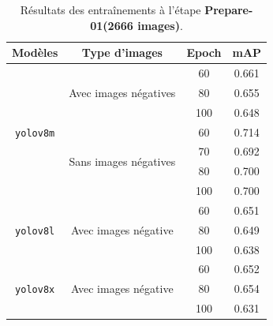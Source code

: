 \begin{table}[H]
	\centering
	\begin{tabular}{|c|c|c|c|}
		\hline
		\textbf{Modèles} & \textbf{Type d'images}                 & \textbf{Epoch} & \textbf{mAP} \\ \hline
		\multirow{7}{*}{\texttt{yolov8m}}
		                 & \multirow{3}{*}{Avec images négatives}
		                 & 60                                     & 0.661                         \\ \cline{3-4}
		                 &                                        & 80             & 0.655        \\ \cline{3-4}
		                 &                                        & 100            & 0.648        \\ \cline{2-4}
		                 & \multirow{4}{*}{Sans images négatives}
		                 & 60                                     & 0.714                         \\ \cline{3-4}
		                 &                                        & 70             & 0.692        \\ \cline{3-4}
		                 &                                        & 80             & 0.700        \\ \cline{3-4}
		                 &                                        & 100            & 0.700        \\ \hline

		\multirow{3}{*}{\texttt{yolov8l}}
		                 & \multirow{3}{*}{Avec images négative}
		                 & 60                                     & 0.651                         \\ \cline{3-4}
		                 &                                        & 80             & 0.649        \\ \cline{3-4}
		                 &                                        & 100            & 0.638        \\ \hline

		\multirow{3}{*}{\texttt{yolov8x}}
		                 & \multirow{3}{*}{Avec images négative}
		                 & 60                                     & 0.652                         \\ \cline{3-4}
		                 &                                        & 80             & 0.654        \\ \cline{3-4}
		                 &                                        & 100            & 0.631        \\ \hline
	\end{tabular}
	\caption{Résultats des entraînements à l'étape \textbf{Prepare-01(2666 images)}.}
	\label{tab:results_with_without_annotation}
\end{table}



